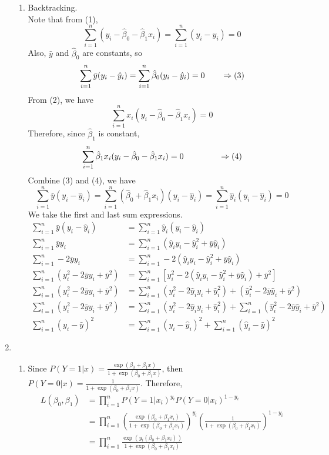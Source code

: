 \documentclass{article}
\begin{document}
\begin{enumerate}
\begin{enumerate}
        \item Backtracking.\\
        Note that from (1),
        \[\sum_{i=1}^{n} (y_i-\hat{\beta}_0-\hat{\beta}_1x_i) = \sum_{i=1}^{n} (y_i-\hat{y}_i) = 0\]
        Also, $\bar{y}$ and $\hat{\beta}_0$ are constants, so
        \[\sum_{i=1}^{n} \bar{y}(y_i-\hat{y}_i) = \sum_{i=1}^{n} \hat{\beta}_0(y_i-\hat{y}_i)=0 \hspace{0.7 cm}\Rightarrow (3)\]
        From (2), we have
        \[\sum_{i=1}^{n} x_i(y_i-\hat{\beta}_0-\hat{\beta}_1x_i) = 0\]
        Therefore, since $\hat{\beta}_1$ is constant,
        \[\sum_{i=1}^{n} \hat{\beta}_1x_i(y_i-\hat{\beta}_0-\hat{\beta}_1x_i) = 0\hspace{1.5 cm}\Rightarrow (4)\]
        Combine (3) and (4), we have
        \[\sum_{i=1}^{n} \bar{y}(y_i-\hat{y}_i) = \sum_{i=1}^{n} (\hat{\beta}_0+\hat{\beta}_1x_i)(y_i-\hat{y}_i)=\sum_{i=1}^{n} \hat{y}_i(y_i-\hat{y}_i)=0\]
        We take the first and last sum expressions.
        \begin{align*}
            \sum_{i=1}^{n} \bar{y}(y_i-\hat{y}_i) &= \sum_{i=1}^{n} \hat{y}_i(y_i-\hat{y}_i)\\
            \sum_{i=1}^{n} \bar{y}y_i &= \sum_{i=1}^{n} (\hat{y}_iy_i-\hat{y}_i^2+\bar{y}\hat{y}_i)\\
            \sum_{i=1}^{n} -2\bar{y}y_i &= \sum_{i=1}^{n} -2(\hat{y}_iy_i-\hat{y}_i^2+\bar{y}\hat{y}_i)\\
            \sum_{i=1}^{n} (y_i^2-2\bar{y}y_i+\bar{y}^2) &= \sum_{i=1}^{n} [y_i^2-2(\hat{y}_iy_i-\hat{y}_i^2+\bar{y}\hat{y}_i)+\bar{y}^2]\\
            \sum_{i=1}^{n} (y_i^2-2\bar{y}y_i+\bar{y}^2) &= \sum_{i=1}^{n} (y_i^2-2\hat{y}_iy_i+\hat{y}_i^2)+(\hat{y}_i^2-2\bar{y}\hat{y}_i+\bar{y}^2)\\
            \sum_{i=1}^{n} (y_i^2-2\bar{y}y_i+\bar{y}^2) &= \sum_{i=1}^{n} (y_i^2-2\hat{y}_iy_i+\hat{y}_i^2)+\sum_{i=1}^{n}(\hat{y}_i^2-2\bar{y}\hat{y}_i+\bar{y}^2)\\
            \sum_{i=1}^{n} (y_i-\bar{y})^2 &= \sum_{i=1}^{n} (y_i-\hat{y}_i)^2+\sum_{i=1}^{n}(\hat{y}_i-\bar{y})^2
        \end{align*}
    \end{enumerate}
    
    \item
    \begin{enumerate}
        \item Since $P(Y=1\vert x)=\frac{\exp(\beta_0+\beta_1x)}{1+\exp(\beta_0+\beta_1x)}$, then $P(Y=0\vert x)=\frac{1}{1+\exp(\beta_0+\beta_1x)}$. Therefore,
        \begin{align*}
            L(\beta_0,\beta_1)&=\prod_{i=1}^{n}P(Y=1\vert x_i)^{y_i}P(Y=0\vert x_i)^{1-y_i}\\
            &= \prod_{i=1}^{n}\left(\frac{\exp(\beta_0+\beta_1x_i)}{1+\exp(\beta_0+\beta_1x_i)}\right)^{y_i}\left(\frac{1}{1+\exp(\beta_0+\beta_1x_i)}\right)^{1-y_i}\\
            &= \prod_{i=1}^{n}\frac{\exp(y_i(\beta_0+\beta_1x_i))}{1+\exp(\beta_0+\beta_1x_i)}
        \end{align*}
        

\end{enumerate}
\end{enumerate}
\end{document}
